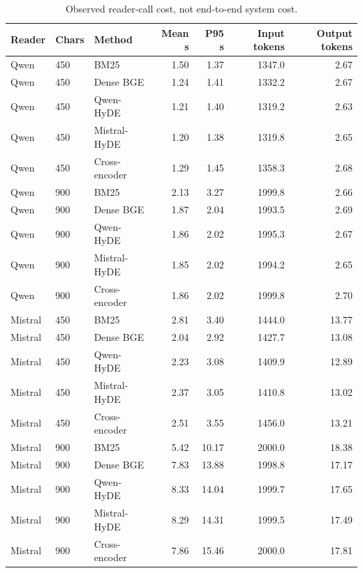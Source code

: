 \begin{table}[!htbp]
\centering\footnotesize
\caption{Observed reader-call cost, not end-to-end system cost.}
\label{tab:mhrag_cost}
\begin{threeparttable}
\setlength{\tabcolsep}{3pt}
\begin{tabular}{lllrrrr}
\toprule
Reader & Chars & Method & Mean s & P95 s & Input tokens & Output tokens \\
\midrule
Qwen & 450 & BM25 & 1.50 & 1.37 & 1347.0 & 2.67 \\
Qwen & 450 & Dense BGE & 1.24 & 1.41 & 1332.2 & 2.67 \\
Qwen & 450 & Qwen-HyDE & 1.21 & 1.40 & 1319.2 & 2.63 \\
Qwen & 450 & Mistral-HyDE & 1.20 & 1.38 & 1319.8 & 2.65 \\
Qwen & 450 & Cross-encoder & 1.29 & 1.45 & 1358.3 & 2.68 \\
Qwen & 900 & BM25 & 2.13 & 3.27 & 1999.8 & 2.66 \\
Qwen & 900 & Dense BGE & 1.87 & 2.04 & 1993.5 & 2.69 \\
Qwen & 900 & Qwen-HyDE & 1.86 & 2.02 & 1995.3 & 2.67 \\
Qwen & 900 & Mistral-HyDE & 1.85 & 2.02 & 1994.2 & 2.65 \\
Qwen & 900 & Cross-encoder & 1.86 & 2.02 & 1999.8 & 2.70 \\
Mistral & 450 & BM25 & 2.81 & 3.40 & 1444.0 & 13.77 \\
Mistral & 450 & Dense BGE & 2.04 & 2.92 & 1427.7 & 13.08 \\
Mistral & 450 & Qwen-HyDE & 2.23 & 3.08 & 1409.9 & 12.89 \\
Mistral & 450 & Mistral-HyDE & 2.37 & 3.05 & 1410.8 & 13.02 \\
Mistral & 450 & Cross-encoder & 2.51 & 3.55 & 1456.0 & 13.21 \\
Mistral & 900 & BM25 & 5.42 & 10.17 & 2000.0 & 18.38 \\
Mistral & 900 & Dense BGE & 7.83 & 13.88 & 1998.8 & 17.17 \\
Mistral & 900 & Qwen-HyDE & 8.33 & 14.04 & 1999.7 & 17.65 \\
Mistral & 900 & Mistral-HyDE & 8.29 & 14.31 & 1999.5 & 17.49 \\
Mistral & 900 & Cross-encoder & 7.86 & 15.46 & 2000.0 & 17.81 \\
\bottomrule
\end{tabular}

\end{threeparttable}
\end{table}
